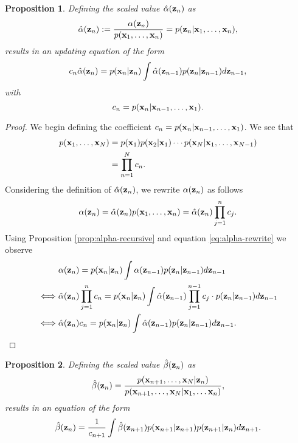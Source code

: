 \documentclass[11pt]{article}
\numberwithin{equation}{section}
\newcommand{\x}{{\bf x}}
\newcommand{\z}{{\bf z}}
\newtheorem{proposition}{Proposition}[section]
\begin{document}
\begin{proposition} \label{prop:alpha-hat}
	Defining the scaled value $\hat\alpha(\z_n)$ as
	\begin{equation}
		\hat\alpha(\z_n) := \frac{\alpha(\z_n)}{p(\x_1, \ldots, \x_n)} = p(\z_n \vert \x_1, \ldots, \x_n),
	\end{equation}
	results in an updating equation of the form
	\begin{equation}
		 c_n \hat\alpha(\z_n) = p(\x_n\vert\z_n)\int \hat\alpha(\z_{n-1})p(\z_n \vert \z_{n-1}) d\z_{n-1},
	\end{equation}
	with
	\begin{equation}
		c_n = p(\x_n \vert \x_{n-1}, \ldots, \x_1).
	\end{equation}
\end{proposition}

\begin{proof}
	We begin defining the coefficient $c_n = p(\x_n \vert \x_{n-1}, \ldots, \x_1)$. We see that
	\begin{align}
		p(\x_1, \ldots, \x_N) &=  p(\x_1) p(\x_2 \vert \x_1) \cdots p(\x_N \vert \x_1, \ldots, \x_{N-1})\\
		&= \prod_{n=1}^N c_n.
	\end{align}
	Considering the definition of $\hat\alpha(\z_n)$, we rewrite $\alpha(\z_n)$ as follows
	\begin{equation} \label{eq:alpha-rewrite}
		\alpha(\z_n) = \hat\alpha(\z_n) p(\x_1, \ldots, \x_n) = \hat\alpha(\z_n) \prod_{j=1}^n c_j.
	\end{equation}
	Using Proposition \ref{prop:alpha-recursive} and equation \eqref{eq:alpha-rewrite} we observe
	\begin{align}
		&\alpha(\z_n) = p(\x_n\vert \z_n) \int  \alpha(\z_{n-1})p(\z_n\vert\z_{n-1}) d\z_{n-1}\\
		\iff & \hat\alpha(\z_n) \prod_{j=1}^{n} c_n = p(\x_n \vert \z_n) \int  \hat\alpha(\z_{n-1}) \prod_{j=1}^{n-1} c_j \cdot  p(\z_n\vert\z_{n-1}) d\z_{n-1}\\
		\iff & \hat\alpha(\z_n) c_n =   p(\x_n \vert \z_n) \int  \hat\alpha(\z_{n-1})   p(\z_n\vert\z_{n-1}) d\z_{n-1}.
	\end{align}
\end{proof}

\begin{proposition} \label{prop:beta-hat}
	Defining the scaled value $\hat\beta(\z_n)$ as
	\begin{equation}
		\hat\beta(\z_n) = \frac{p(\x_{n+1}, \ldots, \x_N \vert \z_n)}{p(\x_{n+1}, \ldots, \x_N \vert \x_1, \ldots \x_n)},
	\end{equation}
	results in an equation of the form
	\begin{equation}
		\hat\beta(\z_n) = \frac{1}{c_{n+1}}\int \hat\beta(\z_{n+1})p(\x_{n+1}\vert\z_{n+1})p(\z_{n+1}\vert\z_n) d\z_{n+1}.
	\end{equation}
\end{proposition}
\end{document}

